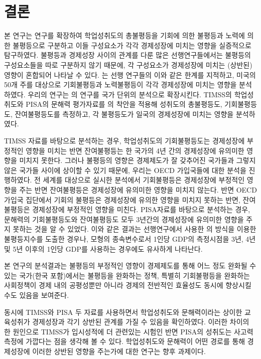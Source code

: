 

\section{결론}

본 연구는 \citet{kno17} 연구를 확장하여 학업성취도의 총불평등을 기회에 의한 불평등과 노력에 의한 불평등으로 구분하고 이들 구성요소가 각각 경제성장에 미치는 영향을 실증적으로 탐구하였다. 불평등과 경제성장 사이의 관계를 다룬 많은 선행연구들에서는 불평등의 구성요소들을 따로 구분하지 않기 때문에, 각 구성요소가 경제성장에 미치는 (상반된) 영향이 혼합되어 나타날 수 있다. \citet{mnr13}는 선행 연구들의 이와 같은 한계를 지적하고, 미국의 50개 주를 대상으로 기회불평등과 노력불평등이 각각 경제성장에 미치는 영향을 분석하였다. 우리의 연구는 \citet{mnr13}의 연구를 국가 단위의 분석으로 확장시킨다. TIMSS의 학업성취도와 PISA의 문해력 평가자료를 \citet{betl12}의 착안을 적용해 성취도의 총불평등도, 기회불평등도, 잔여불평등도를 측정하고, 각 불평등도가 일국의 경제성장에 미치는 영향을 분석하였다.

TIMSS 자료를 바탕으로 분석하는 경우, 학업성취도의 기회불평등도는 경제성장에 부정적인 영향을 미치는 반면 잔여불평등는 한 국가의 4년 간의 경제성장에 유의미한 영향을 미치지 못한다.
그러나 불평등의 영향은 경제제도가 잘 갖추어진 국가들과 그렇지 않은 국가들 사이에 상이할 수 있기 때문에, 우리는 OECD 가입국들에 대한 분석을 진행하였다.
전 세계를 대상으로 실시한 분석에서 기회불평등은 경제성장에 부정적인 영향을 주는 반면 잔여불평등은 경제성장에 유의미한 영향을 미치지 않는다.
반면 OECD 가입국 집단에서 기회의 불평등은 경제성장에 유의한 영향을 미치지 못하는 반면, 잔여불평등은 경제성장에 부정적인 영향을 미친다.
PISA자료를 바탕으로 분석하는 경우, 문해력의 기회불평등도와 잔여불평등도 모두 3년간의 경제성장에 유의미한 영향을 주지 못하는 것을 알 수 있었다.
이와 같은 결과는 선행연구에서 사용한 \citeauthor{fng11}의 방식을 이용한 불평등지수를 도출한 경우나, 모형의 종속변수로서 1인당 GDP의 측정시점을 3년, 4년 및 5년 이후의 1인당 GDP를 사용하는 경우에도 유사하게 나타난다.
 
본 연구의 분석결과는 불평등의 부정적인 영향이 경제제도를 통해 어느 정도 완화될 수 있는 국가(한국 포함)에서는 불평등을 완화하는 정책, 특별히 기회불평등을 완화하는 사회정책이 경제 내의 공평성뿐만 아니라 경제의 전반적인 효율성도 동시에 향상시킬 수도 있음을 보여준다.

동시에 TIMSS와 PISA 두 자료를 사용하면서 학업성취도와 문해력이라는 상이한 교육성취가 경제성장과 각기 상반된 관계를 가질 수 있음을 확인하였다.
이러한 차이의 한 원인으로 TIMSS가 입시성적에 더 관련있는 시험인 반면 PISA의 성취도는 사고력 측정에 가깝다는 점을 생각해 볼 수 있다.
학업성취도와 문해력이 어떤 경로를 통해 경제성장에 이러한 상반된 영향을 주는가에 대한 연구는 향후 과제이다.

